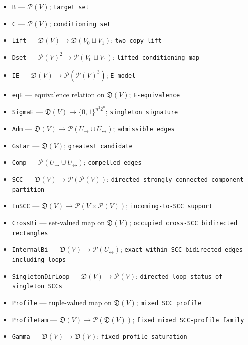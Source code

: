 \documentclass{article}
\begin{document}
\begin{itemize}
  \item \texttt{B} --- \(\mathcal P(V)\); \texttt{target set}
  \item \texttt{C} --- \(\mathcal P(V)\); \texttt{conditioning set}
  \item \texttt{Lift} --- \(\mathfrak D(V)\to\mathfrak D(V_0\sqcup V_1)\); \texttt{two-\allowbreak{}copy lift}
  \item \texttt{Dset} --- \(\mathcal P(V)^2\to\mathcal P(V_0\sqcup V_1)\); \texttt{lifted conditioning map}
  \item \texttt{IE} --- \(\mathfrak D(V)\to\mathcal P(\mathcal P(V)^3)\); \texttt{E-\allowbreak{}model}
  \item \texttt{eqE} --- equivalence relation on \(\mathfrak D(V)\); \texttt{E-\allowbreak{}equivalence}
  \item \texttt{SigmaE} --- \(\mathfrak D(V)\to\{0,1\}^{n^2 2^n}\); \texttt{singleton signature}
  \item \texttt{Adm} --- \(\mathfrak D(V)\to\mathcal P(U_{\to}\cup U_{\leftrightarrow})\); \texttt{admissible edges}
  \item \texttt{Gstar} --- \(\mathfrak D(V)\); \texttt{greatest candidate}
  \item \texttt{Comp} --- \(\mathcal P(U_{\to}\cup U_{\leftrightarrow})\); \texttt{compelled edges}
  \item \texttt{SCC} --- \(\mathfrak D(V)\to\mathcal P(\mathcal P(V))\); \texttt{directed strongly connected component partition}
  \item \texttt{InSCC} --- \(\mathfrak D(V)\to\mathcal P(V\times\mathcal P(V))\); \texttt{incoming-\allowbreak{}to-\allowbreak{}SCC support}
  \item \texttt{CrossBi} --- set-valued map on \(\mathfrak D(V)\); \texttt{occupied cross-\allowbreak{}SCC bidirected rectangles}
  \item \texttt{InternalBi} --- \(\mathfrak D(V)\to\mathcal P(U_{\leftrightarrow})\); \texttt{exact within-\allowbreak{}SCC bidirected edges including loops}
  \item \texttt{SingletonDirLoop} --- \(\mathfrak D(V)\to\mathcal P(V)\); \texttt{directed-\allowbreak{}loop status of singleton SCCs}
  \item \texttt{Profile} --- tuple-valued map on \(\mathfrak D(V)\); \texttt{mixed SCC profile}
  \item \texttt{ProfileFam} --- \(\mathfrak D(V)\to\mathcal P(\mathfrak D(V))\); \texttt{fixed mixed SCC-\allowbreak{}profile family}
  \item \texttt{Gamma} --- \(\mathfrak D(V)\to\mathfrak D(V)\); \texttt{fixed-\allowbreak{}profile saturation}

\end{itemize}
\end{document}
